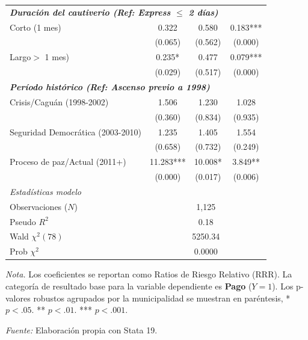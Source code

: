 \documentclass[12pt]{article}
\theoremstyle{definition}
\theoremstyle{remark}
\newcommand{\1}{\mathbf{1}}
\begin{document}
{\begin{ThreePartTable}
\begin{longtable}{lccc}
        \multicolumn{4}{l}{\textbf{\textit{Duración del cautiverio (Ref: Express $\le$ 2 días)}}} \\
        Corto (1 mes) & 0.322 & 0.580 & 0.183*** \\
                        & {\scriptsize (0.065)} & {\scriptsize (0.562)} & {\scriptsize (0.000)} \\
        Largo$>$ 1 mes) & 0.235* & 0.477 & 0.079*** \\
                           & {\scriptsize (0.029)} & {\scriptsize (0.517)} & {\scriptsize (0.000)} \\
        \midrule
        
        \multicolumn{4}{l}{\textbf{\textit{Período histórico (Ref: Ascenso previo a 1998)}}} \\
        Crisis/Caguán (1998-2002) & 1.506 & 1.230 & 1.028 \\
                                  & {\scriptsize (0.360)} & {\scriptsize (0.834)} & {\scriptsize (0.935)} \\
        Seguridad Democrática (2003-2010) & 1.235 & 1.405 & 1.554 \\
                                        & {\scriptsize (0.658)} & {\scriptsize (0.732)} & {\scriptsize (0.249)} \\
        Proceso de paz/Actual (2011+) & 11.283*** & 10.008* & 3.849** \\
                                      & {\scriptsize (0.000)} & {\scriptsize (0.017)} & {\scriptsize (0.006)} \\
        \midrule
        
        \multicolumn{4}{l}{\textit{Estadísticas modelo}} \\
        Observaciones ($N$) & \multicolumn{3}{c}{1,125} \\
        Pseudo $R^2$ & \multicolumn{3}{c}{0.18} \\
        Wald $\chi^2(78)$ & \multicolumn{3}{c}{5250.34} \\
        Prob $\chi^2$ & \multicolumn{3}{c}{0.0000} \\
        
    \end{longtable}
    
    \begin{tablenotes}
        \footnotesize 
        \item \textit{Nota.} Los coeficientes se reportan como Ratios de Riesgo Relativo (RRR). La categoría de resultado base para la variable dependiente es \textbf{Pago} ($Y=1$). Los p-valores robustos agrupados por la municipalidad se muestran en paréntesis, * $p < .05$. ** $p < .01$. *** $p < .001$.
        \item \textit{Fuente:} Elaboración propia con Stata 19.
    \end{tablenotes}
\end{ThreePartTable}

}
\end{document}
